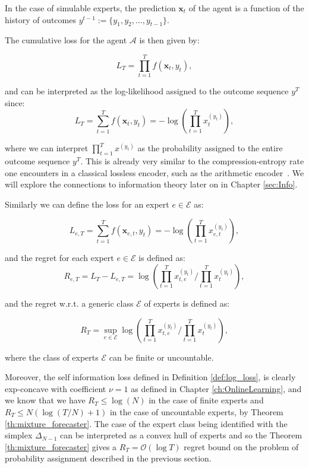 In the case of simulable experts, the prediction $\mathbf x_t$ of the agent is a function of the history of outcomes $y^{t-1}:=\{y_1,y_2,\ldots,y_{t-1}\}$.

The cumulative loss for the agent $\mathcal A$ is then given by:

\begin{equation}
L_T=\prod\limits_{t=1}^T f(\mathbf x_t,y_t),
\end{equation}

and can be interpreted as the log-likelihood assigned to the outcome sequence $y^T$ since:
\begin{equation}\label{eq:loss_log}
L_T=\sum\limits_{t=1}^Tf(\mathbf x_t,y_t)=-\log\left(\prod\limits_{t=1}^T x_t^{(y_t)}\right),
\end{equation}

where we can interpret $\prod\limits_{t=1}^Tx^{(y_t)}$ as the probability assigned to the entire outcome sequence $y^T$. This is already very similar to the compression-entropy rate one encounters in a classical lossless encoder, such as the arithmetic encoder~\cite{langdon1984introduction}. We will explore the connections to information theory later on in Chapter \ref{sec:Info}.

Similarly we can define the loss for an expert $e\in\mathcal E$ as: 

\begin{equation}
L_{e,T}=\sum\limits_{t=1}^Tf(\mathbf x_{e,t},y_t)=-\log\left(\prod\limits_{t=1}^Tx_{e,t}^{(y_t)}\right),
\end{equation}

and the regret for each expert $e\in\mathcal E$ is defined as:
\begin{equation}
R_{e,T}=L_T-L_{e,T}=\log\left(\prod\limits_{t=1}^Tx_{t,e}^{(y_t)}\bigg/\prod\limits_{t=1}^Tx_t^{(y_t)}\right),
\end{equation}

and the regret w.r.t. a generic class $\mathcal E$ of experts is defined as: 

\begin{equation}
R_{T}=\sup\limits_{e\in\mathcal E}\log\left(\prod\limits_{t=1}^Tx_{t,e}^{(y_t)}\bigg/\prod\limits_{t=1}^Tx_t^{(y_t)}\right),
\end{equation}

where the class of experts $\mathcal E$ can be finite or uncountable.

Moreover, the self information loss defined in Definition \ref{def:log_loss}, is clearly exp-concave with coefficient $\nu=1$ as defined in Chapter \ref{ch:OnlineLearning}, and we know that we have $R_T\le\log(N)$ in the case of finite experts and $R_T\le N(\log(T/N)+1)$ in the case of uncountable experts, by Theorem \ref{th:mixture_forecaster}. The case of the expert class being identified with the simplex $\Delta_{N-1}$ can be interpreted as a convex hull of experts and so the Theorem \ref{th:mixture_forecaster} gives a $R_T=\mathcal O(\log T)$ regret bound on the problem of probability assignment described in the previous section.

